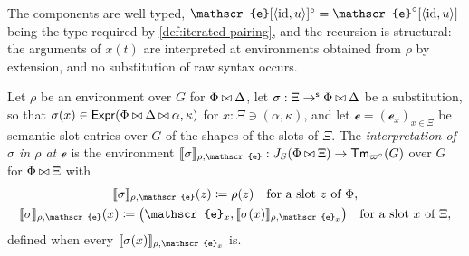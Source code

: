 The components are well typed, $\mathscr{e}[\langle \id, u \rangle]^{\circ} = \mathscr{e}^{\circ}[\langle \id, u \rangle]$ being the type required by \cref{def:iterated-pairing}, and the recursion is structural: the arguments of $x(t)$ are interpreted at environments obtained from $\rho$ by extension, and no substitution of raw syntax occurs.

\begin{definition}\label{def:substitution-environment}
    Let $\rho$ be an environment over $G$ for $\Phi \mathbin{\bowtie} \Delta$, let $\sigma : \Xi \to^{\mathsf{s}} \Phi \mathbin{\bowtie} \Delta$ be a substitution, so that $\sigma(x) \in \mathsf{Expr}(\Phi \mathbin{\bowtie} \Delta \mathbin{\bowtie} \alpha, \kappa)$ for $x : \Xi \ni (\alpha, \kappa)$, and let $\mathscr{e} = (\mathscr{e}_x)_{x \in \Xi}$ be semantic slot entries over $G$ of the shapes of the slots of $\Xi$. The \emph{interpretation of $\sigma$ in $\rho$ at $\mathscr{e}$} is the environment $\sem{\sigma}_{\rho, \mathscr{e}} : J_S(\Phi \concat \Xi) \to \Tm_{\varpi^{\circ}}(G)$ over $G$ for $\Phi \mathbin{\bowtie} \Xi$ with
    \begin{gather*}
        \sem{\sigma}_{\rho, \mathscr{e}}(z) \coloneqq \rho(z) \quad \text{for a slot $z$ of } \Phi,\\
        \sem{\sigma}_{\rho, \mathscr{e}}(x) \coloneqq \big(\mathscr{e}_x, \sem{\sigma(x)}_{\rho, \mathscr{e}_x}\big) \quad \text{for a slot $x$ of } \Xi,
    \end{gather*}
    defined when every $\sem{\sigma(x)}_{\rho, \mathscr{e}_x}$ is.
\end{definition}

